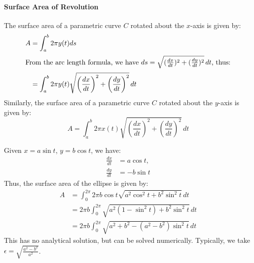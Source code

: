 \documentclass[11pt]{article}
\begin{document}
\paragraph{Surface Area of Revolution} The surface area of a parametric curve $C$ rotated about the $x$-axis is given by:
\begin{align}
    A &= \int_a^b 2\pi y(t) ds \nonumber \\
    \intertext{From the arc length formula, we have $ds = \sqrt{(\frac{dx}{dt})^2 + (\frac{dy}{dt})^2} \, dt$, thus:}
    &= \int_a^b 2\pi y(t) \sqrt{\left(\frac{dx}{dt}\right)^2 + \left(\frac{dy}{dt}\right)^2} \, dt
\end{align}
Similarly, the surface area of a parametric curve $C$ rotated about the $y$-axis is given by:
\begin{equation}
    A = \int_a^b 2\pi x(t) \sqrt{\left(\frac{dx}{dt}\right)^2 + \left(\frac{dy}{dt}\right)^2} \, dt
\end{equation}
\begin{example}
    Given $x = a\sin t$, $y = b\cos t$, we have:
    \begin{align*}
        \frac{dx}{dt} &= a\cos t, \\
        \frac{dy}{dt} &= -b\sin t
    \end{align*}
    Thus, the surface area of the ellipse is given by:
    \begin{align*}
        A &= \int_0^{2\pi} 2\pi b\cos t \sqrt{a^2\cos^2 t + b^2\sin^2 t} \, dt \\
        &= 2\pi b \int_0^{2\pi} \sqrt{a^2 (1 - \sin^2 t) + b^2 \sin^2 t} \, dt \\
        &= 2\pi b \int_0^{2\pi} \sqrt{a^2 + b^2 - (a^2 - b^2)\sin^2 t} \, dt
    \end{align*}
    This has no analytical solution, but can be solved numerically. Typically, we take $\epsilon = \sqrt{\frac{a^2-b^2}{a^2}}$.
\end{example}

\appendix

\end{document}
